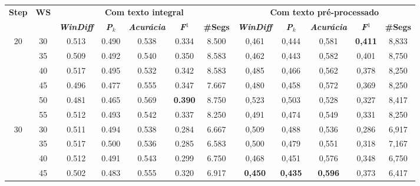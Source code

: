



\begin{table}[!h]
\tiny 
	\begin{tabular}{|c|c||c|c|c|c|c||c|c|c|c|c|}
\hline 
\multirow{2}{*}{\textbf{Step}} & \multirow{2}{*}{\textbf{WS}}
																				  & \multicolumn{5}{c||}{\textbf{Com texto integral}} & \multicolumn{5}{c|}{\textbf{Com texto pré-processado}}\\\cline{3-12} 
																			   && \textit{\textbf{WinDiff}} & \textbf{\textit{P}}$_k$ & \textit{\textbf{Acurácia}} & \textbf{\textit{F}}$^1$ & \textbf{\#Segs} &  \textit{\textbf{WinDiff}} & \textbf{\textit{P}}$_k$ & \textit{\textbf{Acurácia}} & \textbf{\textit{F}}$^1$ & \textbf{\#Segs}\\ \hline 
 \multirow{6}{*}{20} 
  & 30 & 0.513 & 0.490 & 0.538 & 0.334  & 8.500                 & 0,461 & 0,444 & 0,581 & \cellcolor{gray!20} \textbf{0,411} & 8,833  \\ \cline{2-12} 
  & 35 & 0.509 & 0.492 & 0.540 & 0.350  & 8.583                 & 0,462 & 0,443 & 0,582 & 0,401 & 8,750  \\  \cline{2-12}
  & 40 & 0.517 & 0.495 & 0.532 & 0.342  & 8.583                 & 0,485 & 0,466 & 0,562 & 0,378 & 8,250  \\  \cline{2-12}
  & 45 & 0.496 & 0.477 & 0.555 & 0.347  & 7.667                 & 0,480 & 0,458 & 0,572 & 0,369 & 8,250  \\  \cline{2-12}
  & 50 & 0.481 & 0.465 & 0.569 & \cellcolor{gray!20} \textbf{0.390} & 8.750  & 0,523 & 0,503 & 0,528 & 0,327 & 8,417  \\  \cline{2-12}
  & 55 & 0.512 & 0.493 & 0.542 & 0.337  & 8.250  & 0,491 & 0,474 & 0,549 & 0,331 & 8,250  \\ \hline      
 \multirow{6}{*}{30} 
  & 30 & 0.511 & 0.494 & 0.538 & 0.284  & 6.667                & 0,509 & 0,488 & 0,536 & 0,286 & 6,917  \\ \cline{2-12}    
  & 35 & 0.517 & 0.500 & 0.536 & 0.285  & 6.583                & 0,500 & 0,479 & 0,551 & 0,318 & 7,167  \\ \cline{2-12}         
  & 40 & 0.512 & 0.491 & 0.543 & 0.299  & 6.750                & 0,468 & 0,451 & 0,576 & 0,348 & 6,750  \\ \cline{2-12} 
  & 45 & 0.502 & 0.483 & 0.555 & 0.320  & 6.917                & \cellcolor{gray!20} \textbf{0,450} & \cellcolor{gray!20} \textbf{0,435} & \cellcolor{gray!20} \textbf{0,596} & 0,373 & 6,417  \\  \cline{2-12} 

\end{tabular}
\end{table}
